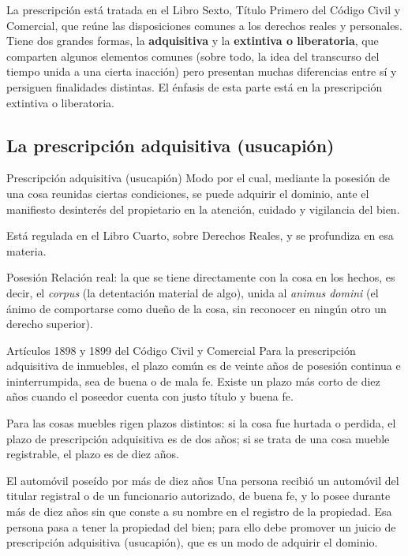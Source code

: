 \documentclass[12pt,oneside]{book}
\begin{document}
La prescripción está tratada en el Libro Sexto, Título Primero del Código Civil y Comercial, que reúne las disposiciones comunes a los derechos reales y personales. Tiene dos grandes formas, la \textbf{adquisitiva} y la \textbf{extintiva o liberatoria}, que comparten algunos elementos comunes (sobre todo, la idea del transcurso del tiempo unida a una cierta inacción) pero presentan muchas diferencias entre sí y persiguen finalidades distintas. El énfasis de esta parte está en la prescripción extintiva o liberatoria.

\subsection{La prescripción adquisitiva (usucapión)}

\begin{definition}{Prescripción adquisitiva (usucapión)}
Modo por el cual, mediante la posesión de una cosa reunidas ciertas condiciones, se puede adquirir el dominio, ante el manifiesto desinterés del propietario en la atención, cuidado y vigilancia del bien.
\end{definition}

Está regulada en el Libro Cuarto, sobre Derechos Reales, y se profundiza en esa materia.

\begin{definition}{Posesión}
Relación real: la que se tiene directamente con la cosa en los hechos, es decir, el \textit{corpus} (la detentación material de algo), unida al \textit{animus domini} (el ánimo de comportarse como dueño de la cosa, sin reconocer en ningún otro un derecho superior).
\end{definition}

\begin{articulo}{Artículos 1898 y 1899 del Código Civil y Comercial}
Para la prescripción adquisitiva de inmuebles, el plazo común es de veinte años de posesión continua e ininterrumpida, sea de buena o de mala fe. Existe un plazo más corto de diez años cuando el poseedor cuenta con justo título y buena fe.
\end{articulo}

Para las cosas muebles rigen plazos distintos: si la cosa fue hurtada o perdida, el plazo de prescripción adquisitiva es de dos años; si se trata de una cosa mueble registrable, el plazo es de diez años.

\begin{example}{El automóvil poseído por más de diez años}
Una persona recibió un automóvil del titular registral o de un funcionario autorizado, de buena fe, y lo posee durante más de diez años sin que conste a su nombre en el registro de la propiedad. Esa persona pasa a tener la propiedad del bien; para ello debe promover un juicio de prescripción adquisitiva (usucapión), que es un modo de adquirir el dominio.
\end{example}
\end{document}
